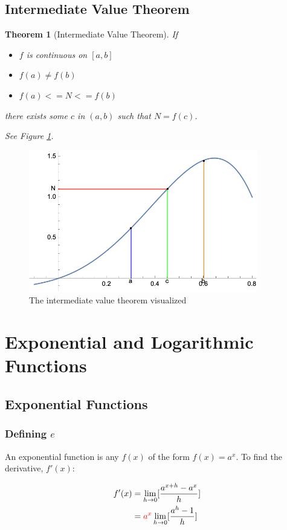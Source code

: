 \documentclass[12pt]{article}
\newtheorem*{theorem}{Theorem}
\begin{document}
\subsection{Intermediate Value Theorem}
\begin{theorem}[Intermediate Value Theorem]
    If
    \begin{itemize}
        \item $f$ is continuous on $[a,b]$
        \item $f(a) \neq f(b)$
        \item $f(a) <= N <= f(b)$
    \end{itemize}

    there exists some $c$ in $(a,b)$ such that $N = f(c)$.
    
    See Figure \ref{ivt}.
\end{theorem}
\begin{figure}[!ht]
    \centering
    \includegraphics[width=10.0cm]{misc/imvt.png}
    \caption{The intermediate value theorem visualized}
    \label{ivt}
\end{figure}

\section{Exponential and Logarithmic Functions}
\subsection{Exponential Functions}
\subsubsection{Defining \texorpdfstring{$e$}{Euler's number}}

An exponential function is any $f(x)$ of the form $f(x) = a^x$. To find the derivative, $f'(x)$:

\begin{equation}
    \begin{split}
        f'(x) &= \lim_{h\to 0} [\frac{a^{x+h}-a^x}{h}]\\
        &=\textcolor{red}{a^x}\lim_{h\to 0}[\frac{a^h-1}{h}]\\
    \end{split}
\end{equation}
\end{document}

